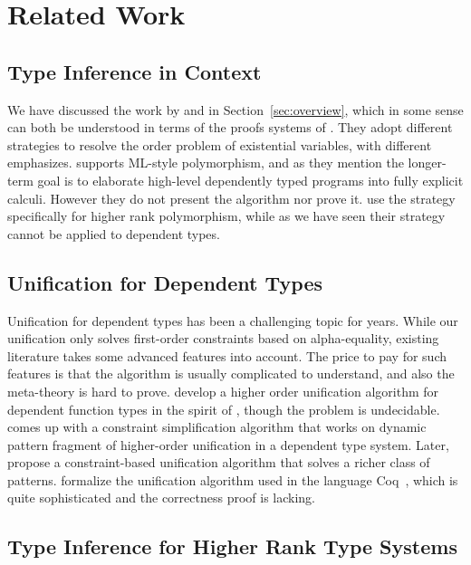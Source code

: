 \section{Related Work}

\subsection{Type Inference in Context}

We have discussed the work by \citet{gundry2010type} and
\citet{dunfield2013complete} in Section~\ref{sec:overview}, which in some sense
can both be understood in terms of the proofs systems of
\citet{miller1992unification}. They adopt different strategies to resolve the
order problem of existential variables, with different emphasizes.
\citet{gundry2010type} supports ML-style polymorphism, and as they mention the
longer-term goal is to elaborate high-level dependently typed programs into
fully explicit calculi. However they do not present the algorithm nor prove it.
\citet{dunfield2013complete} use the strategy specifically for higher rank
polymorphism, while as we have seen their strategy cannot be applied to dependent types.

\subsection{Unification for Dependent Types}

Unification for dependent types has been a challenging topic for years. While
our unification only solves first-order constraints based on alpha-equality,
existing literature takes some advanced features into account. The
price to pay for such features is 
that the algorithm is usually complicated to understand, and also the
meta-theory is hard to prove. \citet{elliott1989higher} develop a higher order
unification algorithm for dependent function types in the spirit of
\citet{huet1975unification}, though the problem is undecidable.
\citet{reed2009higher} comes up with a constraint simplification algorithm that
works on dynamic pattern fragment of higher-order unification in a
dependent type system.
Later, \citet{abel2011higher} propose a constraint-based unification algorithm
that solves a richer class of patterns.
\citet{ziliani2015unification} formalize the unification algorithm used in the
language Coq~\citep{coqsite}, which is quite sophisticated and the correctness
proof is lacking.

\subsection{Type Inference for Higher Rank Type Systems}

